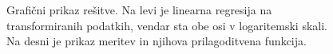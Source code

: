 \documentclass[slovene,11pt,a4paper]{article}
\numberwithin{equation}{section} %
\numberwithin{figure}{section} %
\numberwithin{table}{section} %
\begin{document}
\begin{figure}[ht]
\noindent{}

\caption{Grafični prikaz rešitve. Na levi je linearna regresija na transformiranih podatkih, vendar sta obe osi v logaritemski skali. Na desni je prikaz meritev in njihova prilagoditvena funkcija.}
\end{figure}
\pagebreak
\end{document}
